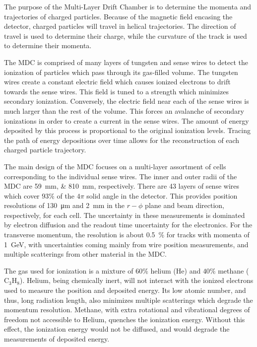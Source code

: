 The purpose of the Multi-Layer Drift Chamber is to determine the momenta and trajectories of charged particles.
Because of the magnetic field encasing the detector, charged particles will travel in helical trajectories.
The direction of travel is used to determine their charge, while the curvature of the track is used to determine their momenta.


The MDC is comprised of many layers of tungsten and sense wires to detect the ionization of particles which pass through its gas-filled volume.
The tungsten wires create a constant electric field which causes ionized electrons to drift towards the sense wires.
This field is tuned to a strength which minimizes secondary ionization.
Conversely, the electric field near each of the sense wires is much larger than the rest of the volume.
This forces an avalanche of secondary ionizations in order to create a current in the sense wires.
The amount of energy deposited by this process is proportional to the original ionization levels.
Tracing the path of energy depositions over time allows for the reconstruction of each charged particle trajectory.


The main design of the MDC focuses on a multi-layer assortment of cells corresponding to the individual sense wires.
The inner and outer radii of the MDC are \SIlist{59;810}{\mm}, respectively.
There are 43 layers of sense wires which cover $93\%$ of the $4\pi$ solid angle in the detector.
This provides position resolutions of \SI{130}{\um} and \SI{2}{\mm} in the $r-\phi$ plane and beam direction, respectively, for each cell.
The uncertainty in these measurements is dominated by electron diffusion and the readout time uncertainty for the electronics.
For the transverse momentum, the resolution is about \SI{0.5}{\%} for tracks with momenta of \SI{1}{\GeV}, with uncertainties coming mainly from wire position measurements, and multiple scatterings from other material in the MDC.


The gas used for ionization is a mixture of $60 \%$ helium (He) and $40 \%$ methane ($\text{C}_3\text{H}_8$).
Helium, being chemically inert, will not interact with the ionized electrons used to measure the position and deposited energy.
Its low atomic number, and thus, long radiation length, also minimizes multiple scatterings which degrade the momentum resolution.
Methane, with extra rotational and vibrational degrees of freedom not accessible to Helium, quenches the ionization energy.
Without this effect, the ionization energy would not be diffused, and would degrade the measurements of deposited energy.


